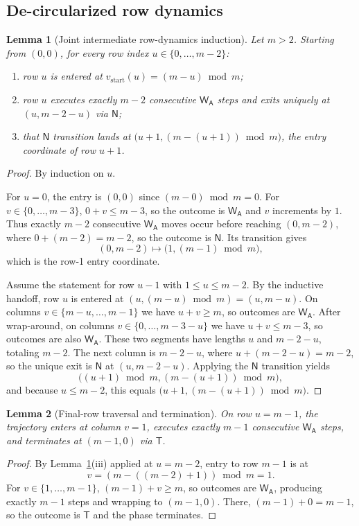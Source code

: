 \documentclass[11pt]{article}
\newtheorem{lemma}{Lemma}
\theoremstyle{definition}
\theoremstyle{remark}
\newcommand{\WA}{\mathsf{W_A}}
\newcommand{\TT}{\mathsf{T}}
\newcommand{\NN}{\mathsf{N}}
\begin{document}
\subsection{De-circularized row dynamics}
\begin{lemma}[Joint intermediate row-dynamics induction]\label{lem:joint-row}
Let $m>2$. Starting from $(0,0)$, for every row index $u\in\{0,\dots,m-2\}$:
\begin{enumerate}[label=(\roman*),nosep]
\item row $u$ is entered at $v_{\mathrm{start}}(u)=(m-u)\bmod m$;
\item row $u$ executes exactly $m-2$ consecutive $\WA$ steps and exits uniquely at $(u,m-2-u)$ via $\NN$;
\item that $\NN$ transition lands at $\bigl(u+1,(m-(u+1))\bmod m\bigr)$, the entry coordinate of row $u+1$.
\end{enumerate}
\end{lemma}
\begin{proof}
By induction on $u$.

For $u=0$, the entry is $(0,0)$ since $(m-0)\bmod m=0$. For $v\in\{0,\dots,m-3\}$, $0+v\le m-3$, so
the outcome is $\WA$ and $v$ increments by $1$. Thus exactly $m-2$ consecutive $\WA$ moves occur before
reaching $(0,m-2)$, where $0+(m-2)=m-2$, so the outcome is $\NN$. Its transition gives
\[
(0,m-2)\mapsto\bigl(1,(m-1)\bmod m\bigr),
\]
which is the row-1 entry coordinate.

Assume the statement for row $u-1$ with $1\le u\le m-2$. By the inductive handoff, row $u$ is entered at
$(u,(m-u)\bmod m)=(u,m-u)$. On columns $v\in\{m-u,\dots,m-1\}$ we have $u+v\ge m$, so outcomes are $\WA$.
After wrap-around, on columns $v\in\{0,\dots,m-3-u\}$ we have $u+v\le m-3$, so outcomes are also $\WA$.
These two segments have lengths $u$ and $m-2-u$, totaling $m-2$. The next column is $m-2-u$, where
$u+(m-2-u)=m-2$, so the unique exit is $\NN$ at $(u,m-2-u)$. Applying the $\NN$ transition yields
\[
\bigl((u+1)\bmod m,(m-(u+1))\bmod m\bigr),
\]
and because $u\le m-2$, this equals $\bigl(u+1,(m-(u+1))\bmod m\bigr)$.
\end{proof}

\begin{lemma}[Final-row traversal and termination]\label{lem:final-row}
On row $u=m-1$, the trajectory enters at column $v=1$, executes exactly $m-1$ consecutive $\WA$ steps,
and terminates at $(m-1,0)$ via $\TT$.
\end{lemma}
\begin{proof}
By Lemma~\ref{lem:joint-row}(iii) applied at $u=m-2$, entry to row $m-1$ is at
\[
v=(m-((m-2)+1))\bmod m=1.
\]
For $v\in\{1,\dots,m-1\}$, $(m-1)+v\ge m$, so outcomes are $\WA$, producing exactly $m-1$ steps and wrapping
to $(m-1,0)$. There, $(m-1)+0=m-1$, so the outcome is $\TT$ and the phase terminates.
\end{proof}
\end{document}
